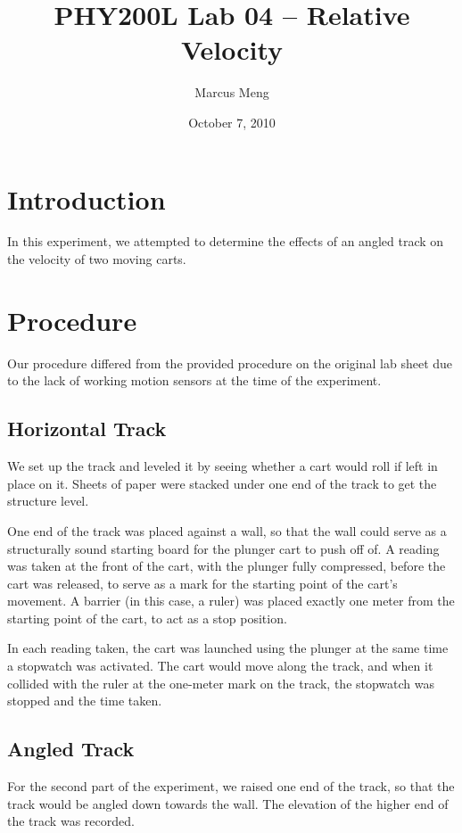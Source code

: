 \documentclass{article}
\title{PHY200L Lab 04 -- Relative Velocity}
\author{Marcus Meng}
\date{October 7, 2010}
\begin{document}
\maketitle

\section{Introduction}

In this experiment, we attempted to determine the effects of an angled track on the velocity of two moving carts.

\section{Procedure}

Our procedure differed from the provided procedure on the original lab sheet due to the lack of working motion sensors at the time of the experiment.

\subsection{Horizontal Track}

We set up the track and leveled it by seeing whether a cart would roll if left in place on it.
Sheets of paper were stacked under one end of the track to get the structure level.

One end of the track was placed against a wall, so that the wall could serve as a structurally sound starting board for the plunger cart to push off of.
A reading was taken at the front of the cart, with the plunger fully compressed, before the cart was released, to serve as a mark for the starting point of the cart's movement.
A barrier (in this case, a ruler) was placed exactly one meter from the starting point of the cart, to act as a stop position.

In each reading taken, the cart was launched using the plunger at the same time a stopwatch was activated.
The cart would move along the track, and when it collided with the ruler at the one-meter mark on the track, the stopwatch was stopped and the time taken.

\subsection{Angled Track}

For the second part of the experiment, we raised one end of the track, so that the track would be angled down towards the wall.
The elevation of the higher end of the track was recorded.
\end{document}
